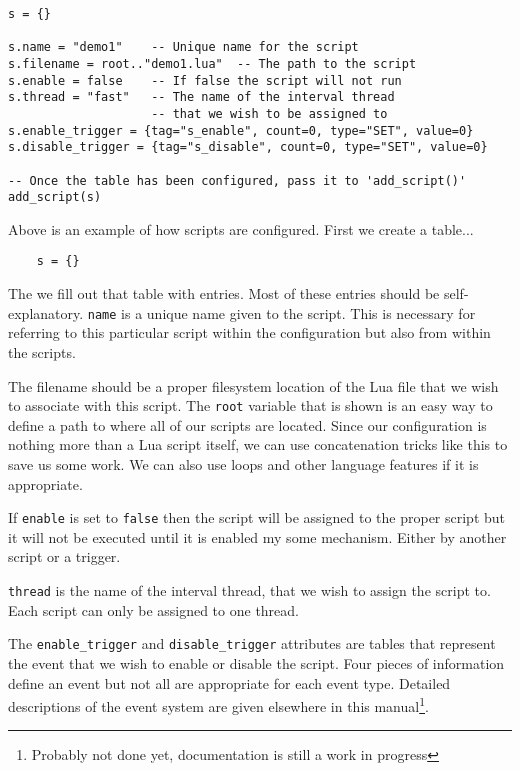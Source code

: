 \begin{verbatim}
s = {}

s.name = "demo1"    -- Unique name for the script
s.filename = root.."demo1.lua"  -- The path to the script
s.enable = false    -- If false the script will not run
s.thread = "fast"   -- The name of the interval thread
                    -- that we wish to be assigned to
s.enable_trigger = {tag="s_enable", count=0, type="SET", value=0}
s.disable_trigger = {tag="s_disable", count=0, type="SET", value=0}

-- Once the table has been configured, pass it to 'add_script()'
add_script(s)

\end{verbatim}

Above is an example of how scripts are configured.  First we create a table...

\begin{verbatim}
	s = {}
\end{verbatim}

The we fill out that table with entries.  Most of these entries should be self-explanatory.  \texttt{name}
is a unique name given to the script.  This is necessary for referring to this particular script
within the configuration but also from within the scripts.

The filename should be a proper filesystem location of the Lua file that we wish to associate with this script.
The \texttt{root} variable that is shown is an easy way to define a path to where all of our scripts are
located.  Since our configuration is nothing more than a Lua script itself, we can use concatenation
tricks like this to save us some work.  We can also use loops and other language features if it is
appropriate.

If \texttt{enable} is set to \texttt{false} then the script will be assigned to the proper script but
it will not be executed until it is enabled my some mechanism.  Either by another script or a trigger.

\texttt{thread} is the name of the interval thread, that we wish to assign the script to.  Each
script can only be assigned to one thread.

The \texttt{enable\_trigger} and \texttt{disable\_trigger} attributes are tables that represent the \opendax
event that we wish to enable or disable the script.  Four pieces of information define an event but
not all are appropriate for each event type.  Detailed descriptions of the event system are given
elsewhere in this manual\footnote{Probably not done yet, documentation is still a work in progress}.

